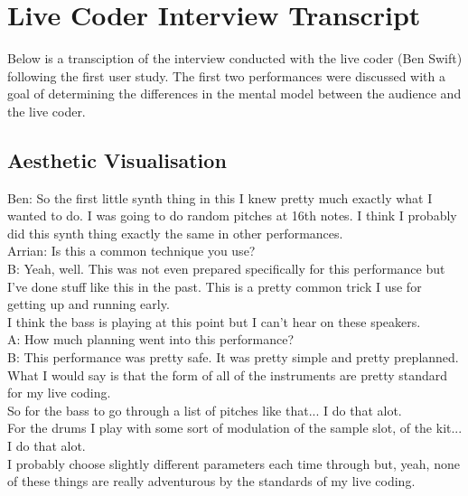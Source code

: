 \chapter{Live Coder Interview Transcript}

Below is a transciption of the interview conducted with the live coder (Ben Swift) following the first user study. The first two performances were discussed with a goal of determining the differences in the mental model between the audience and the live coder.

\section*{Aesthetic Visualisation}

Ben: So the first little synth thing in this I knew pretty much exactly what I wanted to do. I was going to do random pitches at 16th notes. I think I probably did this synth thing exactly the same in other performances.\\

Arrian: Is this a common technique you use?\\

B: Yeah, well. This was not even prepared specifically for this performance but I've done stuff like this in the past. This is a pretty common trick I use for getting up and running early.\\

I think the bass is playing at this point but I can't hear on these speakers.\\

A: How much planning went into this performance?\\

B: This performance was pretty safe. It was pretty simple and pretty preplanned. What I would say is that the form of all of the instruments are pretty standard for my live coding.\\

So for the bass to go through a list of pitches like that... I do that alot.\\

For the drums I play with some sort of modulation of the sample slot, of the kit... I do that alot.\\

I probably choose slightly different parameters each time through but, yeah, none of these things are really adventurous by the standards of my live coding.\\

